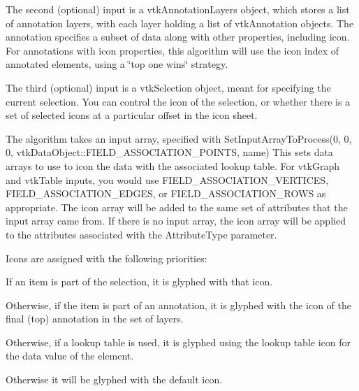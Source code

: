 The second (optional) input is a vtk\-Annotation\-Layers object, which stores a list of annotation layers, with each layer holding a list of vtk\-Annotation objects. The annotation specifies a subset of data along with other properties, including icon. For annotations with icon properties, this algorithm will use the icon index of annotated elements, using a \char`\"{}top one wins\char`\"{} strategy.

The third (optional) input is a vtk\-Selection object, meant for specifying the current selection. You can control the icon of the selection, or whether there is a set of selected icons at a particular offset in the icon sheet.

The algorithm takes an input array, specified with Set\-Input\-Array\-To\-Process(0, 0, 0, vtk\-Data\-Object\-::\-F\-I\-E\-L\-D\-\_\-\-A\-S\-S\-O\-C\-I\-A\-T\-I\-O\-N\-\_\-\-P\-O\-I\-N\-T\-S, name) This sets data arrays to use to icon the data with the associated lookup table. For vtk\-Graph and vtk\-Table inputs, you would use F\-I\-E\-L\-D\-\_\-\-A\-S\-S\-O\-C\-I\-A\-T\-I\-O\-N\-\_\-\-V\-E\-R\-T\-I\-C\-E\-S, F\-I\-E\-L\-D\-\_\-\-A\-S\-S\-O\-C\-I\-A\-T\-I\-O\-N\-\_\-\-E\-D\-G\-E\-S, or F\-I\-E\-L\-D\-\_\-\-A\-S\-S\-O\-C\-I\-A\-T\-I\-O\-N\-\_\-\-R\-O\-W\-S as appropriate. The icon array will be added to the same set of attributes that the input array came from. If there is no input array, the icon array will be applied to the attributes associated with the Attribute\-Type parameter.

Icons are assigned with the following priorities\-: 
\begin{DoxyEnumerate}
\item If an item is part of the selection, it is glyphed with that icon. 
\item Otherwise, if the item is part of an annotation, it is glyphed with the icon of the final (top) annotation in the set of layers. 
\item Otherwise, if a lookup table is used, it is glyphed using the lookup table icon for the data value of the element. 
\item Otherwise it will be glyphed with the default icon. 
\end{DoxyEnumerate}

